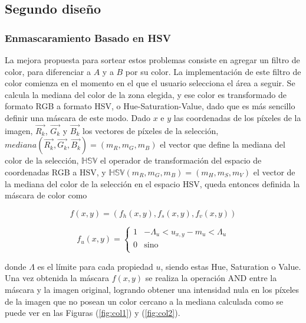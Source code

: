 \subsection{Segundo diseño}

\subsubsection{Enmascaramiento Basado en HSV}

La mejora propuesta para sortear estos problemas consiste en agregar un filtro de color, para diferenciar a $A$ y a $B$ por su color. La implementación de este filtro de color comienza en el momento en el que el usuario selecciona el área a seguir. Se calcula la mediana del color de la zona elegida, y ese color es transformado de formato RGB a formato HSV, o Hue-Saturation-Value, dado que es más sencillo definir una máscara de este modo. Dado $x$ e $y$ las coordenadas de los píxeles de la imagen, $\vec{R_k}$, $\vec{G_k}$ y $\vec{B_k}$ los vectores de píxeles de la selección, $mediana(\vec{R_k}, \vec{G_k}, \vec{B_k}) = (m_R, m_G, m_B)$ el vector que define la mediana del color de la selección, $\mathbb{HSV}$ el operador de transformación del espacio de coordenadas RGB a HSV, y $\mathbb{HSV}(m_R, m_G, m_B) = (m_H, m_S, m_V)$ el vector de la mediana del color de la selección en el espacio HSV, queda entonces definida la máscara de color como

\begin{equation}
f(x, y) = (f_h(x, y), f_s(x, y), f_v(x, y))
\end{equation}

\begin{equation}
f_{u}(x,y) = \left\{
\begin{array}{ll}


      1 & -\Lambda_u < u_{x, y} - m_u < \Lambda_u \\
      
      
      
      0 & \text{sino} \\
      
      
\end{array} 
\right.
\end{equation}

donde $\Lambda$ es el límite para cada propiedad $u$, siendo estas Hue, Saturation o Value. Una vez obtenida la máscara $f(x, y)$ se realiza la operación AND entre la máscara y la imagen original, logrando obtener una intensidad nula en los píxeles de la imagen que no posean un color cercano a la mediana calculada como se puede ver en las Figuras (\ref{fig:col1}) y (\ref{fig:col2}).


